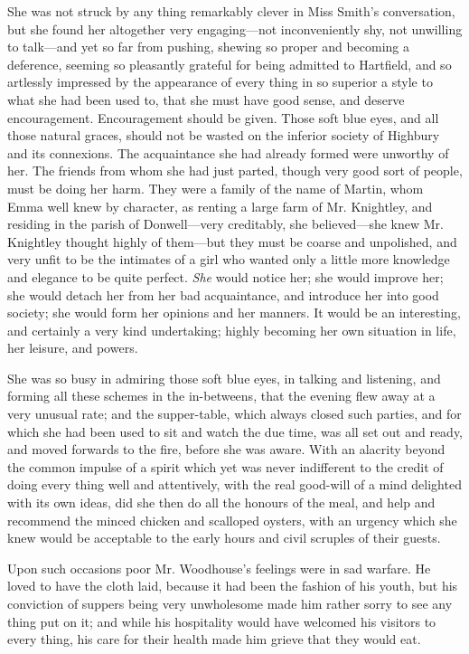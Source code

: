 She was not struck by any thing remarkably clever in Miss Smith's conversation, but she found her altogether very engaging---not inconveniently shy, not unwilling to talk---and yet so far from pushing, shewing so proper and becoming a deference, seeming so pleasantly grateful for being admitted to Hartfield, and so artlessly impressed by the appearance of every thing in so superior a style to what she had been used to, that she must have good sense, and deserve encouragement. Encouragement should be given. Those soft blue eyes, and all those natural graces, should not be wasted on the inferior society of Highbury and its connexions. The acquaintance she had already formed were unworthy of her. The friends from whom she had just parted, though very good sort of people, must be doing her harm. They were a family of the name of Martin, whom Emma well knew by character, as renting a large farm of Mr. Knightley, and residing in the parish of Donwell---very creditably, she believed---she knew Mr. Knightley thought highly of them---but they must be coarse and unpolished, and very unfit to be the intimates of a girl who wanted only a little more knowledge and elegance to be quite perfect. {\em She} would notice her; she would improve her; she would detach her from her bad acquaintance, and introduce her into good society; she would form her opinions and her manners. It would be an interesting, and certainly a very kind undertaking; highly becoming her own situation in life, her leisure, and powers.

She was so busy in admiring those soft blue eyes, in talking and listening, and forming all these schemes in the in-betweens, that the evening flew away at a very unusual rate; and the supper-table, which always closed such parties, and for which she had been used to sit and watch the due time, was all set out and ready, and moved forwards to the fire, before she was aware. With an alacrity beyond the common impulse of a spirit which yet was never indifferent to the credit of doing every thing well and attentively, with the real good-will of a mind delighted with its own ideas, did she then do all the honours of the meal, and help and recommend the minced chicken and scalloped oysters, with an urgency which she knew would be acceptable to the early hours and civil scruples of their guests.

Upon such occasions poor Mr. Woodhouse's feelings were in sad warfare. He loved to have the cloth laid, because it had been the fashion of his youth, but his conviction of suppers being very unwholesome made him rather sorry to see any thing put on it; and while his hospitality would have welcomed his visitors to every thing, his care for their health made him grieve that they would eat.

